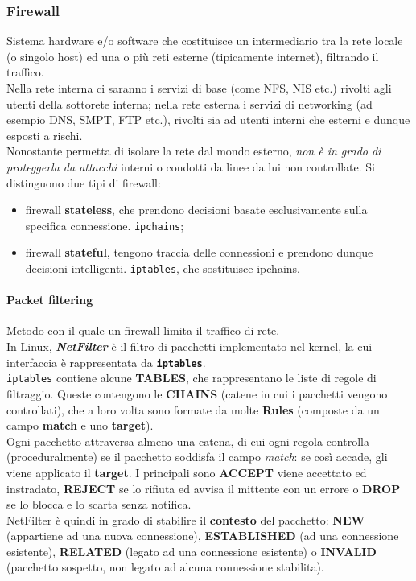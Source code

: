 \documentclass[a4paper,11pt]{article}
\def\code#1{\texttt{#1}}
\def\subsub#1{\subsubsection{#1}\label{#1}}
\def\para#1{\paragraph{#1}\label{#1}}
\begin{document}
\subsub{Firewall} Sistema hardware e/o software che costituisce un intermediario tra la rete locale (o singolo host) ed una o più reti esterne (tipicamente internet), filtrando il traffico.\\
Nella rete interna ci saranno i servizi di base (come NFS, NIS etc.) rivolti agli utenti della sottorete interna; nella rete esterna i servizi di networking (ad esempio DNS, SMPT, FTP etc.), rivolti sia ad utenti interni che esterni e dunque esposti a rischi.\\
Nonostante permetta di isolare la rete dal mondo esterno, \textit{non è in grado di proteggerla da attacchi }interni o condotti da linee da lui non controllate.
Si distinguono due tipi di firewall:
\begin{itemize}
\item firewall \textbf{stateless}, che prendono decisioni basate esclusivamente sulla specifica connessione. \code{ipchains};
\item firewall \textbf{stateful}, tengono traccia delle connessioni e prendono dunque decisioni intelligenti. \code{iptables}, che sostituisce ipchains.
\end{itemize}
\para{Packet filtering} Metodo con il quale un firewall limita il traffico di rete.\\
In Linux, \textit{\textbf{NetFilter}} è il filtro di pacchetti  implementato nel kernel, la cui interfaccia è rappresentata da \textbf{\code{iptables}}.\\
\code{iptables} contiene alcune \textbf{TABLES}, che rappresentano le liste di regole di filtraggio. Queste contengono le \textbf{CHAINS} (catene in cui i pacchetti vengono controllati), che a loro volta sono formate da molte \textbf{Rules} (composte da un campo \textbf{match} e uno \textbf{target}).\\ Ogni pacchetto attraversa almeno una catena, di cui ogni regola controlla (proceduralmente) se il pacchetto soddisfa il campo \textit{match}: se così accade, gli viene applicato il \textbf{target}. I principali sono \textbf{ACCEPT} viene accettato ed instradato, \textbf{REJECT} se lo rifiuta ed avvisa il mittente con un errore o \textbf{DROP} se lo blocca e lo scarta senza notifica.\\
NetFilter è quindi in grado di stabilire il \textbf{contesto} del pacchetto: \textbf{NEW} (appartiene ad una nuova connessione), \textbf{ESTABLISHED} (ad una connessione esistente), \textbf{RELATED} (legato ad una connessione esistente) o \textbf{INVALID} (pacchetto sospetto, non legato ad alcuna connessione stabilita).
\newpage
\end{document}
